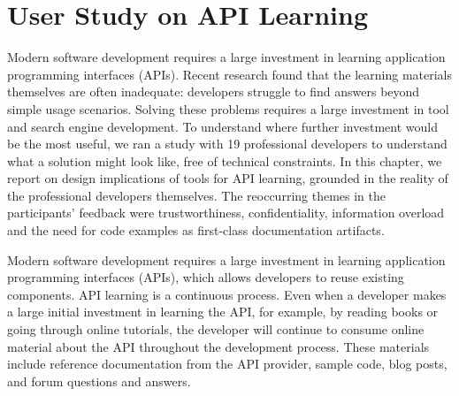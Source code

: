 

\chapter{User Study on API Learning}
\label{the chapter on the MSR user study}

Modern software development requires a large investment in learning application programming interfaces (APIs).
%
Recent research found that the learning materials themselves are often inadequate: developers struggle to find answers beyond simple usage scenarios.
%
Solving these problems requires a large investment in tool and search engine development.
%
To understand where further investment would be the most useful, we ran a study with 19 professional developers to understand what a solution might look like, free of technical constraints. In this chapter, we report on design implications of tools for API learning, grounded in the reality of the professional developers themselves. 
The reoccurring themes in the participants' feedback were trustworthiness, confidentiality, information overload and the need for code examples as first-class documentation artifacts.

Modern software development requires a large investment in learning application programming interfaces (APIs), which allows developers to reuse existing components. API learning is a continuous process. Even when a developer makes a large initial investment in learning the API, 
for example, by reading books or going through online tutorials, 
the developer will continue to consume online material 
about the API 
throughout the development process. These materials include reference documentation from the API provider, sample code, blog posts, and forum questions and answers. 


